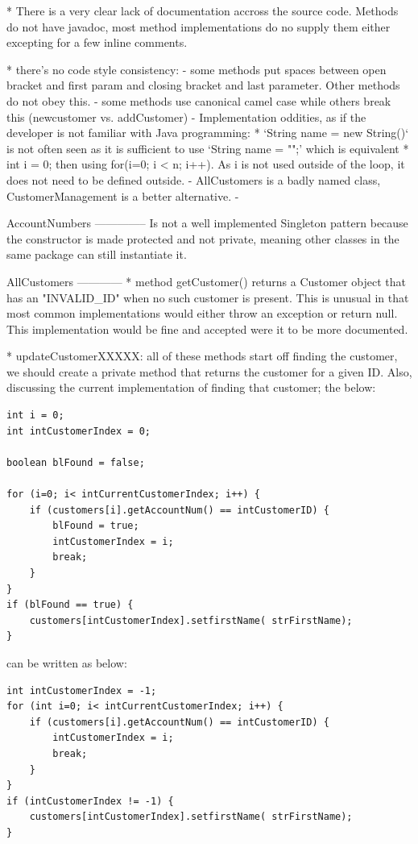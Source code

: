 
* There is a very clear lack of documentation accross the source code. Methods do not have javadoc, most method implementations do no supply them either excepting for a few inline comments. 

* there's no code style consistency: 
	- some methods put spaces between open bracket and first param and closing bracket and last parameter. Other methods do not obey this. 
	- some methods use canonical camel case while others break this (newcustomer vs. addCustomer)
	- Implementation oddities, as if the developer is not familiar with Java programming: 
		* `String name = new String()` is not often seen as it is sufficient to use `String name = "";' which is equivalent
		* int i = 0; then using for(i=0; i < n; i++). As i is not used outside of the loop, it does not need to be defined outside. 
	- AllCustomers is a badly named class, CustomerManagement is a better alternative. 
	- 

AccountNumbers
--------------
Is not a well implemented Singleton pattern because the constructor is made protected and not private, meaning other classes in the same package can still instantiate it.


AllCustomers
------------
* method getCustomer() returns a Customer object that has an "INVALID\_ID" when no such customer is present. This is unusual in that most common implementations would either throw an exception or return null. This implementation would be fine and accepted were it to be more documented. 


* updateCustomerXXXXX: all of these methods start off finding the customer, we should create a private method that returns the customer for a given ID. Also, discussing the current implementation of finding that customer; the below: 

\begin{lstlisting}	
int i = 0;
int intCustomerIndex = 0;

boolean blFound = false;

for (i=0; i< intCurrentCustomerIndex; i++) {
	if (customers[i].getAccountNum() == intCustomerID) {
		blFound = true;
		intCustomerIndex = i;
		break;
	}
}
if (blFound == true) {
	customers[intCustomerIndex].setfirstName( strFirstName);
}
\end{lstlisting}
can be written as below: 
\begin{lstlisting}
int intCustomerIndex = -1;
for (int i=0; i< intCurrentCustomerIndex; i++) {
	if (customers[i].getAccountNum() == intCustomerID) {
		intCustomerIndex = i;
		break;
	}
}
if (intCustomerIndex != -1) {
	customers[intCustomerIndex].setfirstName( strFirstName);
}
\end{lstlisting}

